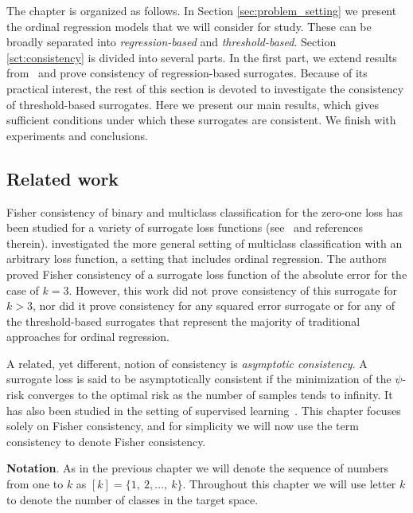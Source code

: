 The chapter is organized as follows. In Section \ref{sec:problem_setting} we present the ordinal regression models that we will consider for study. These can be broadly separated into \emph{regression-based} and \emph{threshold-based}. Section \ref{sct:consistency} is divided into several parts. In the first part, we extend results from~\citet{Ramaswamy2012} and prove consistency of regression-based surrogates. Because of its practical interest, the rest of this section is devoted to investigate the consistency of threshold-based surrogates. Here we present our main results, which gives sufficient conditions under which these surrogates are consistent. We finish with experiments and conclusions.



\subsection{Related work}

Fisher consistency of binary and multiclass classification for the zero-one loss has been studied for a variety of surrogate loss functions (see~\cite{Bartlett2003,Tewari2007} and references therein). \citet{Ramaswamy2012} investigated the more general setting of multiclass classification with an arbitrary loss function, a setting that includes ordinal regression. The authors proved Fisher consistency of a surrogate loss function of the absolute error for the case of $k = 3$. However, this work did not prove consistency of this surrogate for $k > 3$, nor did it prove consistency for any squared error surrogate or for any of the threshold-based surrogates that represent the majority of traditional approaches for ordinal regression.


A related, yet different, notion of consistency is \emph{asymptotic consistency}. A surrogate loss is said to be asymptotically consistent if the minimization of the $\psi$-risk converges to the optimal risk as the number of samples tends to infinity. It has also been studied in the setting of supervised learning~\citep{stone1977consistent,Steinwart2002}. This chapter focuses solely on Fisher consistency, and for simplicity we will now use the term consistency to denote Fisher consistency.

{\bf Notation}. As in the previous chapter we will denote the sequence of numbers from one to $k$ as $[k] = \{1,~2, \ldots,~k \}$. Throughout this chapter we will use letter $k$ to denote the number of classes in the target space. 



